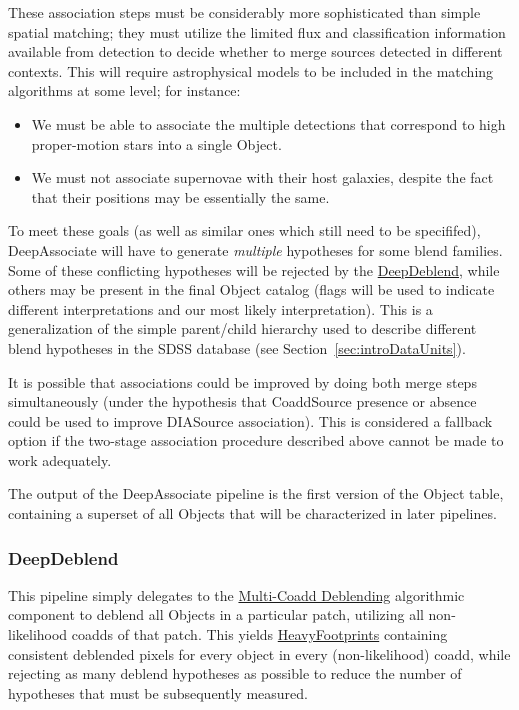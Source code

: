 These association steps must be considerably more sophisticated than simple spatial matching; they must utilize the limited flux and classification information available from detection to decide whether to merge sources detected in different contexts.  This will require astrophysical models to be included in the matching algorithms at some level; for instance:
\begin{itemize}
\item We must be able to associate the multiple detections that correspond to high proper-motion stars into a single Object.
\item We must not associate supernovae with their host galaxies, despite the fact that their positions may be essentially the same.
\end{itemize}
To meet these goals (as well as similar ones which still need to be specififed), DeepAssociate will have to generate \emph{multiple} hypotheses for some blend families.  Some of these conflicting hypotheses will be rejected by the \hyperref[sec:drpDeepDeblend]{DeepDeblend}, while others may be present in the final Object catalog (flags will be used to indicate different interpretations and our most likely interpretation).  This is a generalization of the simple parent/child hierarchy used to describe different blend hypotheses in the SDSS database (see Section~\ref{sec:introDataUnits}).

It is possible that associations could be improved by doing both merge steps simultaneously (under the hypothesis that CoaddSource presence or absence could be used to improve DIASource association).  This is considered a fallback option if the two-stage association procedure described above cannot be made to work adequately.

The output of the DeepAssociate pipeline is the first version of the Object table, containing a superset of all Objects that will be characterized in later pipelines.

\subsubsection{DeepDeblend}
\label{sec:drpDeepDeblend}

This pipeline simply delegates to the \hyperref[sec:acMultiCoaddDeblending]{Multi-Coadd Deblending} algorithmic component to deblend all Objects in a particular patch, utilizing all non-likelihood coadds of that patch.  This yields \hyperref[sec:spFootprints]{HeavyFootprints} containing consistent deblended pixels for every object in every (non-likelihood) coadd, while rejecting as many deblend hypotheses as possible to reduce the number of hypotheses that must be subsequently measured.

